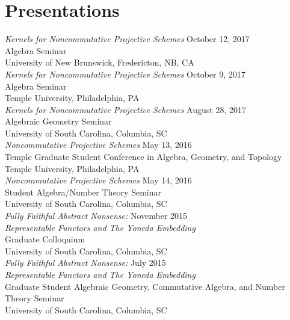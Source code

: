 \documentclass{article}
\begin{document}
  \section*{Presentations}
  \textsl{Kernels for Noncommutative Projective Schemes} \hfill October 12, 2017\\
  Algebra Seminar\\
  University of New Brunswick, Fredericton, NB, CA\\
  
  \noindent\textsl{Kernels for Noncommutative Projective Schemes} \hfill October 9, 2017\\
  Algebra Seminar\\
  Temple University, Philadelphia, PA\\
  
  \noindent\textsl{Kernels for Noncommutative Projective Schemes} \hfill August 28, 2017\\
  Algebraic Geometry Seminar\\
  University of South Carolina, Columbia, SC\\
  
  \noindent\textsl{Noncommutative Projective Schemes} \hfill May 13, 2016\\
  Temple Graduate Student Conference in Algebra, Geometry, and Topology\\
  Temple University, Philadelphia, PA\\

  \noindent\textsl{Noncommutative Projective Schemes} \hfill May 14, 2016\\
  Student Algebra/Number Theory Seminar\\
  University of South Carolina, Columbia, SC\\

  \noindent\textsl{Fully Faithful Abstract Nonsense:} \hfill November 2015\\
  \textsl{Representable Functors and The Yoneda Embedding}\\
  Graduate Colloquium\\
  University of South Carolina, Columbia, SC\\

  \noindent\textsl{Fully Faithful Abstract Nonsense:} \hfill July 2015\\
  \textsl{Representable Functors and The Yoneda Embedding}\\
  Graduate Student Algebraic Geometry, Commutative Algebra, and Number Theory Seminar\\
  University of South Carolina, Columbia, SC
\end{document}
